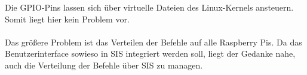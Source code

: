 Die GPIO-Pins lassen sich über virtuelle Dateien des Linux-Kernels ansteuern. Somit liegt hier kein Problem vor.\\
\\
Das größere Problem ist das Verteilen der Befehle auf alle Raspberry Pis. Da das Benutzerinterface sowieso in SIS integriert werden soll, liegt der Gedanke nahe, auch die Verteilung der Befehle über SIS zu managen.
